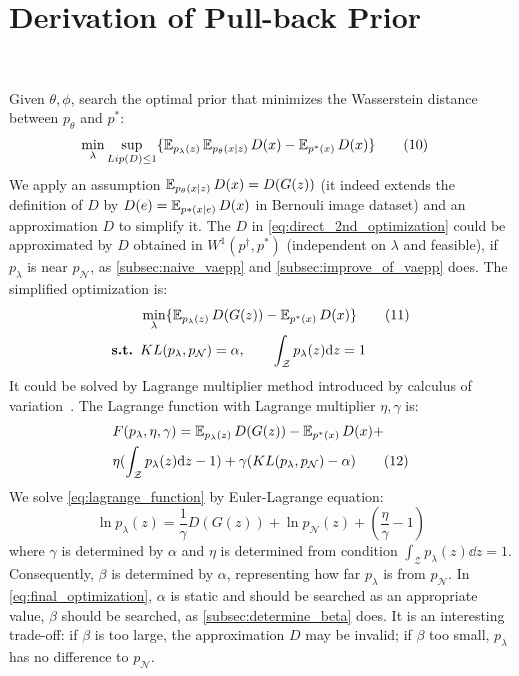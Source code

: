 \section{Derivation of Pull-back Prior}~\label{subsec:inference}

Given $\theta, \phi$, search the optimal prior that minimizes the Wasserstein distance between $p_\theta$ and $p^*$:
\begin{align*}\label{eq:direct_2nd_optimization}
	& \min_{\lambda} \sup_{Lip(D) \leq 1} \{\operatorname{\mathbb{E}}_{p_\lambda(z)} \operatorname{\mathbb{E}}_{p_\theta(x|z)} D(x)  - \operatorname{\mathbb{E}}_{p^*(x)} D(x)\} 
	\tag{10}
\end{align*}
We apply an assumption $\operatorname{\mathbb{E}}_{p_\theta(x|z)} D(x) = D(G(z))$ (it indeed extends the definition of $D$ by $D(e) = \operatorname{\mathbb{E}}_{p*(x|e)} D(x)$ in Bernouli image dataset) and an approximation $D$ to simplify it. The $D$ in \cref{eq:direct_2nd_optimization} could be approximated by $D$ obtained in $W^1(p^\dag, p^*)$ (independent on $\lambda$ and feasible), if $p_\lambda$ is near $p_\mathcal{N}$, as \cref{subsec:naive_vaepp} and \cref{subsec:improve_of_vaepp} does. The simplified optimization is:
\begin{align*}\label{eq:final_optimization}
	& \min_{\lambda} \{\operatorname{\mathbb{E}}_{p_\lambda(z)} D(G(z))  - \operatorname{\mathbb{E}}_{p^*(x)} D(x)\} \tag{11} \\
	{\textbf{s.t. }} & KL(p_\lambda, p_\mathcal{N}) = \alpha, \qquad \int_{\mathcal{Z}} p_\lambda(z) \mathrm{d} z = 1
\end{align*}
It could be solved by Lagrange multiplier method introduced by calculus of variation~\cite{gelfand2000calculus}. The Lagrange function with Lagrange multiplier $\eta, \gamma$ is:
\begin{align*}\label{eq:lagrange_function}
& F(p_\lambda, \eta, \gamma) = \operatorname{\mathbb{E}}_{p_\lambda(z)} D(G(z))  - \operatorname{\mathbb{E}}_{p^*(x)} D(x) + \\
& \eta (\int_{\mathcal{Z}} p_\lambda(z) \mathrm{d} z - 1) + \gamma(KL(p_\lambda, p_\mathcal{N}) - \alpha) \tag{12}
\end{align*}
We solve \cref{eq:lagrange_function} by Euler-Lagrange equation:
\begin{equation*}\label{eq:euler_lagrange_eqaution}
	\ln p_\lambda(z) = \frac{1}{\gamma} D(G(z)) + \ln p_\mathcal{N}(z) + (\frac{\eta}{\gamma} - 1) \tag{13}
\end{equation*}
where $\gamma$ is determined by $\alpha$ and $\eta$ is determined from condition $\int_{\mathcal{Z}} p_\lambda(z) \dd z = 1$.
Consequently, $\beta$ is determined by $\alpha$, representing how far $p_\lambda$ is from $p_\mathcal{N}$. In \cref{eq:final_optimization}, $\alpha$ is static and should be searched as an appropriate value, \IE $\beta$ should be searched, as \cref{subsec:determine_beta} does. It is an interesting trade-off: if $\beta$ is too large, the approximation $D$ may be invalid; if $\beta$ too small, $p_\lambda$ has no difference to $p_\mathcal{N}$. 
 
 